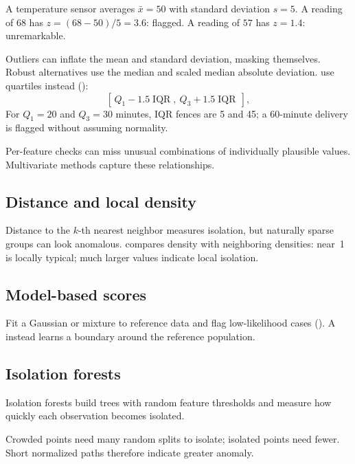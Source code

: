 \begin{workedexample}
A temperature sensor averages $\bar{x}=50$ with standard deviation $s=5$. A reading of $68$ has $z=(68-50)/5=3.6$: flagged. A reading of $57$ has $z=1.4$: unremarkable.
\end{workedexample}

Outliers can inflate the mean and standard deviation, masking themselves. Robust alternatives use the median and scaled median absolute deviation.  use quartiles instead ():
\[
  [\,Q_1-1.5\operatorname{IQR},\ Q_3+1.5\operatorname{IQR}\,],
\]
For $Q_1=20$ and $Q_3=30$ minutes, IQR fences are 5 and 45; a 60-minute delivery is flagged without assuming normality.

Per-feature checks can miss unusual combinations of individually plausible values. Multivariate methods capture these relationships.

\subsection{Distance and local density}

Distance to the $k$-th nearest neighbor measures isolation, but naturally sparse groups can look anomalous.  compares density with neighboring densities: near~1 is locally typical; much larger values indicate local isolation.

\subsection{Model-based scores}

Fit a Gaussian or mixture to reference data and flag low-likelihood cases (). A  instead learns a boundary around the reference population.

\subsection{Isolation forests}
\label{sec:isolation-forest}

Isolation forests build trees with random feature thresholds and measure how quickly each observation becomes isolated.

\begin{intuition}
Crowded points need many random splits to isolate; isolated points need fewer. Short normalized paths therefore indicate greater anomaly.
\end{intuition}

